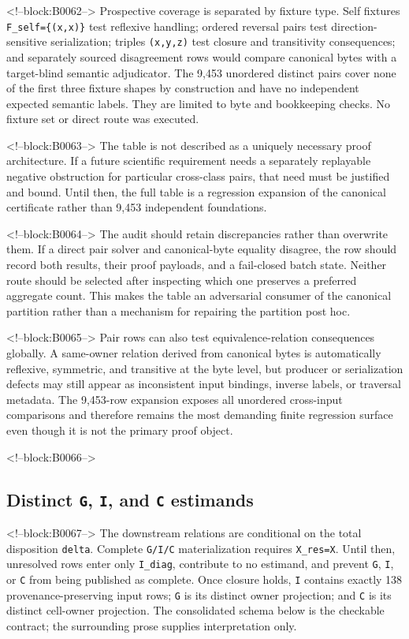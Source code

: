 \documentclass[11pt]{article}
\begin{document}
<!--block:B0062-->
Prospective coverage is separated by fixture type.  Self fixtures
\texttt{F\_self=\{(x,x)\}} test reflexive handling; ordered reversal pairs test
direction-sensitive serialization; triples \texttt{(x,y,z)} test closure and
transitivity consequences; and separately sourced disagreement rows would
compare canonical bytes with a target-blind semantic adjudicator.  The 9,453
unordered distinct pairs cover none of the first three fixture shapes by
construction and have no independent expected semantic labels.  They are limited
to byte and bookkeeping checks.  No fixture set or direct route was executed.

<!--block:B0063-->
The table is not described as a uniquely necessary proof architecture.
If a future scientific requirement needs a separately replayable
negative obstruction for particular cross-class pairs, that need must be
justified and bound. Until then, the full table is a regression
expansion of the canonical certificate rather than 9,453 independent
foundations.

<!--block:B0064-->
The audit should retain discrepancies rather than overwrite them. If a
direct pair solver and canonical-byte equality disagree, the row should
record both results, their proof payloads, and a fail-closed batch state.
Neither route should be selected after inspecting which one preserves a
preferred aggregate count. This makes the table an adversarial consumer
of the canonical partition rather than a mechanism for repairing the
partition post hoc.

<!--block:B0065-->
Pair rows can also test equivalence-relation consequences globally. A
same-owner relation derived from canonical bytes is automatically
reflexive, symmetric, and transitive at the byte level, but producer or
serialization defects may still appear as inconsistent input bindings,
inverse labels, or traversal metadata. The 9,453-row expansion exposes
all unordered cross-input comparisons and therefore remains the most
demanding finite regression surface even though it is not the primary
proof object.

<!--block:B0066-->
\hypertarget{44-distinct-g-i-and-c-estimands}{%
\subsection{\texorpdfstring{Distinct \texttt{G}, \texttt{I}, and
\texttt{C}
estimands}{Distinct G, I, and C estimands}}\label{44-distinct-g-i-and-c-estimands}}

<!--block:B0067-->
The downstream relations are conditional on the total disposition
\texttt{delta}.  Complete \texttt{G/I/C} materialization requires
\texttt{X\_res=X}.  Until then, unresolved rows enter only
\texttt{I\_diag}, contribute to no estimand, and prevent \texttt{G},
\texttt{I}, or \texttt{C} from being published as complete.  Once closure holds,
\texttt{I} contains exactly 138 provenance-preserving input rows;
\texttt{G} is its distinct owner projection; and \texttt{C} is its distinct
cell-owner projection.  The consolidated schema below is the checkable contract;
the surrounding prose supplies interpretation only.
\end{document}

